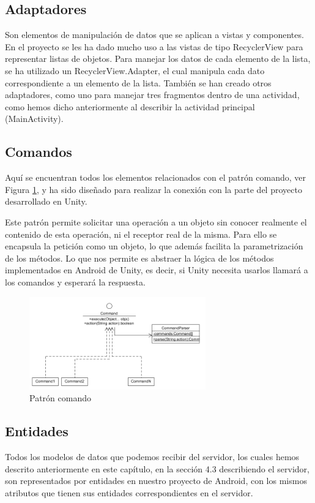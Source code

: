 \subsection{Adaptadores}
\label{makereference4.4.2} 
Son elementos de manipulación de datos que se aplican a vistas y componentes. En el proyecto se les ha dado mucho uso a las vistas de tipo RecyclerView para representar listas de objetos. Para manejar los datos de cada elemento de la lista, se ha utilizado un RecyclerView.Adapter, el cual manipula cada dato correspondiente a un elemento de la lista. También se han creado otros adaptadores, como uno para manejar tres fragmentos dentro de una actividad, como hemos dicho anteriormente al describir la actividad principal (MainActivity).

\subsection{Comandos}
\label{makereference4.4.3}
Aquí se encuentran todos los elementos relacionados con el patrón comando, ver Figura \ref{fig:comando}, y ha sido diseñado para realizar la conexión con la parte del proyecto desarrollado en Unity.

Este patrón permite solicitar una operación a un objeto sin conocer realmente el contenido de esta operación, ni el receptor real de la misma. Para ello se encapsula la petición como un objeto, 
lo que además facilita la parametrización de los métodos.
Lo que nos permite es abstraer la lógica de los métodos implementados en Android de Unity, es decir, si Unity necesita usarlos llamará a los comandos y esperará la respuesta.

\begin{figure}[H]
    \centering
    \includegraphics[width=3in]{figures/chapter-4/command_pattern.png}
    \caption{Patrón comando}
    \label{fig:comando}
\end{figure}



\subsection{Entidades}
\label{makereference4.4.4}
Todos los modelos de datos que podemos recibir del servidor, los cuales hemos descrito anteriormente en este capítulo, en la sección 4.3 describiendo el servidor, son representados por entidades en nuestro proyecto de Android, con los mismos atributos que tienen sus entidades correspondientes en el servidor.


